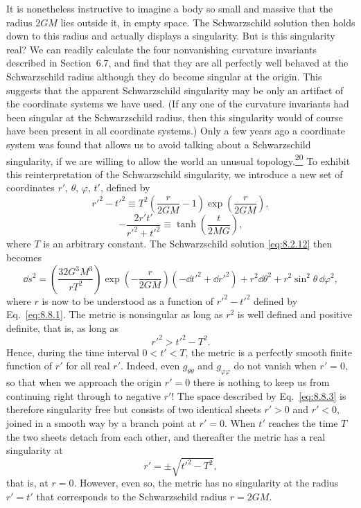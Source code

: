 It is nonetheless instructive to imagine a body so small and massive that
the radius \(2GM\) lies outside it, in empty space. The Schwarzschild
solution then holds down to this radius and actually displays a singularity.
But is this singularity real? We can readily calculate the four
nonvanishing curvature invariants described in Section~6.7, and find that
they are all perfectly well behaved at the Schwarzschild radius although
they do become singular at the origin. This suggests that the apparent
Schwarzschild singularity may be only an artifact of the coordinate systems
we have used. (If any one of the curvature invariants had been singular at
the Schwarzschild radius, then this singularity would of course have been
present in all coordinate systems.) Only a few years ago a coordinate
system was found that allows us to avoid talking about a Schwarzschild
singularity, if we are willing to allow the world an unusual
topology.\hyperref[ch8-ref-20]{\textsuperscript{20}} To exhibit this
reinterpretation of the Schwarzschild singularity, we introduce a new set
of coordinates \(r'\), \(\theta\), \(\varphi\), \(t'\), defined by
\begin{equation}
  r'^2-t'^2
  \equiv
  T^2\left(\frac{r}{2GM}-1\right)
  \exp\left(\frac{r}{2GM}\right),
  \tag{8.8.1}\label{eq:8.8.1}
\end{equation}
\begin{equation}
  -\frac{2r't'}{r'^2+t'^2}
  \equiv
  \tanh\left(\frac{t}{2MG}\right),
  \tag{8.8.2}\label{eq:8.8.2}
\end{equation}
where \(T\) is an arbitrary constant. The Schwarzschild solution
\eqref{eq:8.2.12} then becomes
\begin{equation}
  \dd s^2
  =
  \left(\frac{32G^3M^3}{rT^2}\right)
  \exp\left(-\frac{r}{2GM}\right)
  (-\dd t'^2+\dd r'^2)
  +r^2\dd\theta^2+r^2\sin^2\theta\,\dd\varphi^2,
  \tag{8.8.3}\label{eq:8.8.3}
\end{equation}
where \(r\) is now to be understood as a function of \(r'^2-t'^2\)
defined by Eq.~\eqref{eq:8.8.1}. The metric is nonsingular as long as
\(r^2\) is well defined and positive definite, that is, as long as
\[
  r'^2>t'^2-T^2.
\]
Hence, during the time interval \(0<t'<T\), the metric is a perfectly
smooth finite function of \(r'\) for all real \(r'\). Indeed, even
\(g_{\theta\theta}\) and \(g_{\varphi\varphi}\) do not vanish when
\(r'=0\), so that when we approach the origin \(r'=0\) there is nothing to
keep us from continuing right through to negative \(r'\)! The space
described by Eq.~\eqref{eq:8.8.3} is therefore singularity free but
consists of two identical sheets \(r'>0\) and \(r'<0\), joined in a smooth
way by a branch point at \(r'=0\). When \(t'\) reaches the time \(T\) the
two sheets detach from each other, and thereafter the metric has a real
singularity at
\[
  r'=\pm\sqrt{t'^2-T^2},
\]
that is, at \(r=0\). However, even so, the metric has no singularity at the
radius \(r'=t'\) that corresponds to the Schwarzschild radius \(r=2GM\).

